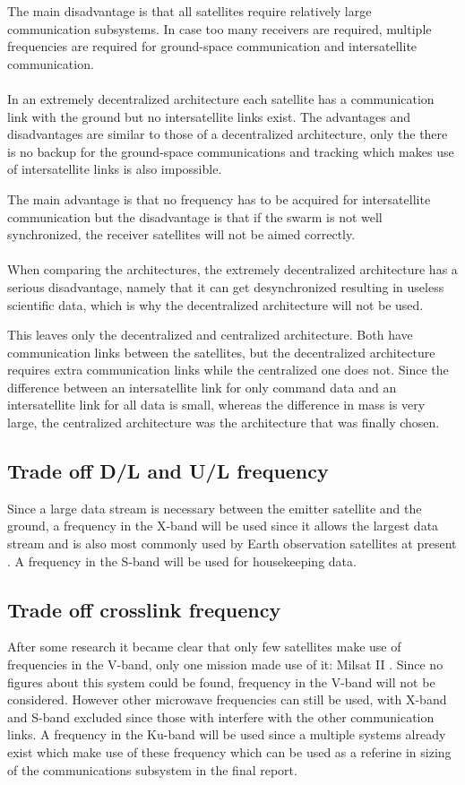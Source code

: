 The main disadvantage is that all satellites require relatively large communication subsystems. In case too many receivers are required, multiple frequencies are required for ground-space communication and intersatellite communication.\\\\
In an extremely decentralized architecture each satellite has a communication link with the ground but no intersatellite links exist.
The advantages and disadvantages are similar to those of a decentralized architecture, only the there is no backup for the ground-space communications and tracking which makes use of intersatellite links is also impossible.

The main advantage is that no frequency has to be acquired for intersatellite communication but the disadvantage is that if the swarm is not well synchronized, the receiver satellites will not be aimed correctly.\\\\
When comparing the architectures, the extremely decentralized architecture has a serious disadvantage, namely that it can get desynchronized resulting in useless scientific data, which is why the decentralized architecture will not be used.

This leaves only the decentralized and centralized architecture. Both have communication links between the satellites, but the decentralized architecture requires extra communication links while the centralized one does not. Since the difference between an intersatellite link for only command data and an intersatellite link for all data is small, whereas the difference in mass is very large, the centralized architecture was the architecture that was finally chosen.

\subsection{Trade off D/L and U/L frequency}
Since a large data stream is necessary between the emitter satellite and the ground, a frequency in the X-band will be used since it allows the largest data stream and is also most commonly used by Earth observation satellites at present \cite{icesattech} \cite{landsatcom}. A frequency in the S-band will be used for housekeeping data.

\subsection{Trade off crosslink frequency}
After some research it became clear that only few satellites make use of frequencies in the V-band, only one mission made use of it: Milsat II \cite{milstar}. Since no figures about this system could be found, frequency in the V-band will not be considered.
However other microwave frequencies can still be used, with X-band and S-band excluded since those with interfere with the other communication links. A frequency in the Ku-band will be used since a multiple systems already exist which make use of these frequency which can be used as a referine in sizing of the communications subsystem in the final report.

